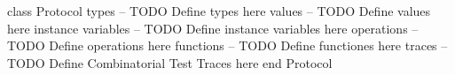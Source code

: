\begin{vdmpp}[breaklines=true]
class Protocol
types
-- TODO Define types here
values
-- TODO Define values here
instance variables
-- TODO Define instance variables here
operations
-- TODO Define operations here
functions
-- TODO Define functiones here
traces
-- TODO Define Combinatorial Test Traces here
end Protocol
\end{vdmpp}
